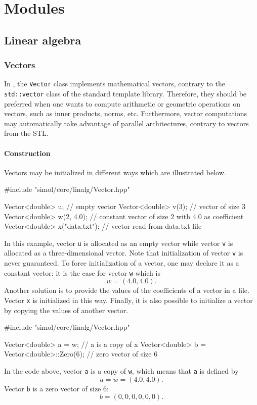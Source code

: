 \chapter{Modules}


\section{Linear algebra}


\subsection{Vectors}

In \Simol, the \texttt{Vector} class implements mathematical vectors, contrary to the \texttt{std::vector} class of the standard template library. Therefore, they should be preferred when one wants to compute arithmetic or geometric operations on vectors, such as inner products, norms, etc. Furthermore, vector computations may automatically take advantage of parallel architectures, contrary to vectors from the STL. 

\subsubsection{Construction}

Vectors may be initialized in different ways which are illustrated below.
\begin{cppcode}
#include "simol/core/linalg/Vector.hpp"

Vector<double> u; // empty vector
Vector<double> v(3); // vector of size 3
Vector<double> w(2, 4.0); // constant vector of size 2 with 4.0 as coefficient
Vector<double> x("data.txt"); // vector read from data.txt file
\end{cppcode}

In this example, vector \texttt{u} is allocated as an empty vector while vector \texttt{v} is allocated as a three-dimensional vector. Note that initialization of vector \texttt{v} is never guaranteed. To force initialization of a vector, one may declare it as a constant vector:  it is the case for vector \texttt{w} which is
\begin{equation*}
w = (4.0, 4.0).
\end{equation*}
Another solution is to provide the values of the coefficients of a vector in a file. Vector \texttt{x} is initialized in this way. Finally, it is also possible to initialize a vector by copying the values of another vector.
\begin{cppcode}
#include "simol/core/linalg/Vector.hpp"

Vector<double> a = w; // a is a copy of x
Vector<double> b = Vector<double>::Zero(6); // zero vector of size 6
\end{cppcode}
In the code above, vector \texttt{a} is a copy of \texttt{w}, which means that \texttt{a} is defined by
\begin{equation*}
a = w = (4.0, 4.0).
\end{equation*}
Vector \texttt{b} is a zero vector of size 6:
\begin{equation*}
b = (0, 0, 0, 0, 0, 0).
\end{equation*}


